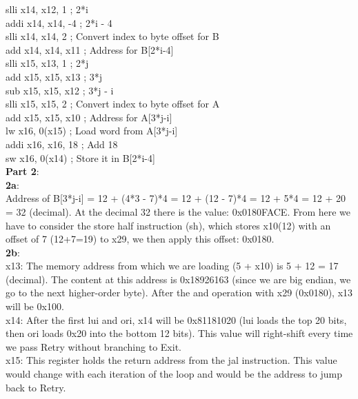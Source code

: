 \documentclass[11pt]{article}
\begin{document}
	 slli x14, x12, 1      ; 2*i\\
	addi x14, x14, -4     ; 2*i - 4\\
	slli x14, x14, 2      ; Convert index to byte offset for B\\
	add x14, x14, x11     ; Address for B[2*i-4]\\
	slli x15, x13, 1      ; 2*j\\
	add x15, x15, x13     ; 3*j\\
	sub x15, x15, x12     ; 3*j - i\\
	slli x15, x15, 2      ; Convert index to byte offset for A\\
	add x15, x15, x10     ; Address for A[3*j-i]\\
	lw x16, 0(x15)        ; Load word from A[3*j-i]\\
	addi x16, x16, 18     ; Add 18\\
	sw x16, 0(x14)        ; Store it in B[2*i-4]\\
	\textbf{Part 2}:\\
		\textbf{2a}:\\
	Address of B[3*j-i] = 12 + (4*3 - 7)*4 = 12 + (12 - 7)*4 = 12 + 5*4 = 12 + 20 = 32 (decimal). At the decimal 32 there is the value: 0x0180FACE. From here we have to consider the store half instruction (sh), which stores x10(12) with an offset of 7 (12+7=19) to x29, we then apply this offset: {0x0180}.\\
	\textbf{2b}:\\
	x13: The memory address from which we are loading (5 + x10) is 5 + 12 = 17 (decimal). The content at this address is 0x18926163 (since we are big endian, we go to the next higher-order byte). After the and operation with x29 (0x0180), x13 will be 0x100.\\
	
	x14: After the first lui and ori, x14 will be 0x81181020 (lui loads the top 20 bits, then ori loads 0x20 into the bottom 12 bits). This value will right-shift every time we pass Retry without branching to Exit. \\
	
	x15: This register holds the return address from the jal instruction. This value would change with each iteration of the loop and would be the address to jump back to Retry.\\
	
\end{document}
